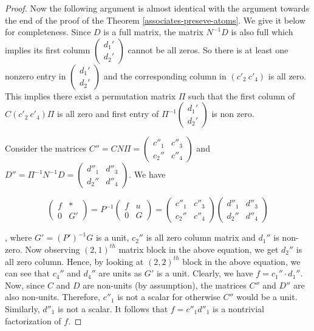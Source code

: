 \documentclass[10pt,a4paper]{article}
\begin{document}
\begin{proof}
%
%
%

Now the following argument is almost identical with the argument towards the end of the proof of the Theorem \ref{associates-preseve-atoms}. We give it below for completeness. 
Since $D$ is a full matrix, the matrix $N^{-1}D$ is also full which
implies its first column $\left(\begin{array}{c} d_1'\\ d_2' \end{array} \right)$ cannot be all zeros. So there is at least one nonzero entry in $\left(\begin{array}{c} d_1'\\ d_2' \end{array} \right)$ and the corresponding column in $(c'_2~c'_4)$ is all zero. This implies there exist a permutation matrix $\Pi$ such that the first column of $C(c'_2~c'_4)\Pi$ is all zero and first entry of $\Pi^{-1} \left(\begin{array}{c} d_1'\\ d_2' \end{array} \right)$ is non zero.

%
%
%
%
%
%
%
%
%
%
%
%
%

Consider the matrices $C''=CN\Pi=\left(
\begin{array}{cc}
c''_1 & c''_3 \\
c_2'' & c''_4
\end{array}
\right)
$ and
$D''=\Pi^{-1}N^{-1}D=\left(
\begin{array}{cc}
d''_1 & d''_3 \\
d_2'' & d''_4
\end{array}
\right)
$. We have

\[  \left(
\begin{array}{cc}
f & * \\
0 & G'
\end{array}
\right)
=P^{-1}
\left(
\begin{array}{cc}
f & u \\
0 & G
\end{array}
\right)
=
\left(
\begin{array}{cc}
c''_1 & c''_3 \\
c_2'' & c''_4
\end{array}
\right)
  \left(
\begin{array}{cc}
d''_1 & d''_3\\
d_2'' & d''_4
\end{array}
\right)
\]

, where $G'=(P')^{-1}G$ is a unit, $c_2''$ is all zero column matrix and $d_1''$ is non-zero. Now observing $(2,1)^{th}$ matrix block in the above equation, we get $d_2''$ is all zero column. Hence, by looking at $(2,2)^{th}$ block in the above equation, we can see that $c_4''$ and $d_4''$ are units as $G'$ is a unit. Clearly, we have $f= c_1'' \cdot d_1 ''$. Now,
since $C$ and $D$ are non-units (by assumption), the matrices $C''$
and $D''$ are also non-units. Therefore, $c''_1$ is not a scalar for
otherwise $C''$ would be a unit. Similarly, $d''_1$ is not a scalar.
It follows that $f=c''_1d''_1$ is a nontrivial factorization of $f$.


\end{proof}
\end{document}
